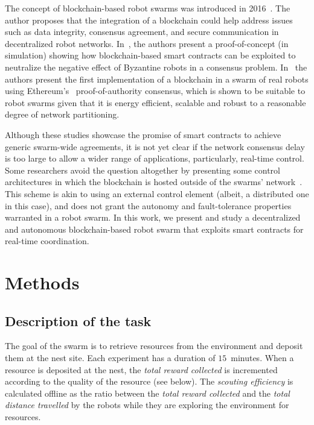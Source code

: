 \documentclass[runningheads]{llncs}
\newcommand{\poa}{proof-of-authority\xspace}
\begin{document}
The concept of blockchain-based robot swarms was introduced in 2016~\cite{ferrer_blockchain_2016}. The author proposes that the integration of a blockchain could help address issues such as data integrity, consensus agreement, and secure communication in decentralized robot networks. In~\cite{StrCasDor2018:aamas,StrCasDor2020_frontiers}, the authors present a proof-of-concept (in simulation) showing how blockchain-based smart contracts can be exploited to neutralize the negative effect of Byzantine robots in a consensus problem. In~\cite{pacheco_ants_2020} the authors present the first implementation of a blockchain in a swarm of real robots using Ethereum's~\cite{buterin_2014_ethereum} \poa consensus, which is shown to be suitable to robot swarms given that it is energy efficient, scalable and robust to a reasonable degree of network partitioning.

 Although these studies showcase the promise of smart contracts to achieve generic swarm-wide agreements, it is not yet clear if the network consensus delay is too large to allow a wider range of applications, particularly, real-time control. Some researchers avoid the question altogether by presenting some control architectures in which the blockchain is hosted outside of the swarms' network~\cite{outsidehosting}. This scheme is akin to using an external control element (albeit, a distributed one in this case), and does not grant the autonomy and fault-tolerance properties warranted in a robot swarm. In this work, we present and study a decentralized and autonomous blockchain-based robot swarm that exploits smart contracts for real-time coordination.

\section{Methods}
\label{sec:methods}

\subsection{Description of the task} 
The goal of the swarm is to retrieve resources from the environment and deposit them at the nest site. Each experiment has a duration of $15$~minutes. When a resource is deposited at the nest, the \emph{total reward collected} is incremented according to the quality of the resource (see below). The \emph{scouting efficiency} is calculated offline as the ratio between the \emph{total reward collected} and the \emph{total distance travelled} by the robots while they are exploring the environment for resources. 
\end{document}

